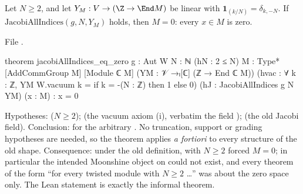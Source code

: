 \begin{theorem}\label{ch06:thm:defect}
Let $N\ge2$, and let $Y_M:V\to(\Z\to\End M)$ be linear with $\mathbf 1_{(k/N)}=\delta_{k,-N}$.  If
$\mathrm{JacobiAllIndices}(g,N,Y_M)$ holds, then $M=0$: every $x\in M$ is zero.
\end{theorem}
\noindent File .
\begin{leancode}
theorem jacobiAllIndices_eq_zero {g : Aut W} {N : ℕ} (hN : 2 ≤ N) {M : Type*}
    [AddCommGroup M] [Module ℂ M] (YM : 𝒱 →ₗ[ℂ] (ℤ → End ℂ M))
    (hvac : ∀ k : ℤ, YM W.vacuum k = if k = -(N : ℤ) then 1 else 0)
    (hJ : JacobiAllIndices g N YM) (x : M) : x = 0
\end{leancode}
\begin{dictionary}
Hypotheses:  ($N\ge2$);  (the vacuum axiom (i), verbatim the field
);  (the old Jacobi field).  Conclusion:  for the arbitrary
.  No truncation, support or grading hypotheses are needed, so the theorem applies
\emph{a fortiori} to every structure of the old shape.  Consequence: under the old definition,
 with $N\ge2$ forced $M=0$; in particular the intended Moonshine object
on  could not exist, and every theorem of the form ``for every twisted module with
$N\ge 2$ \dots'' was about the zero space only.  The Lean statement is exactly the informal
theorem.
\end{dictionary}

